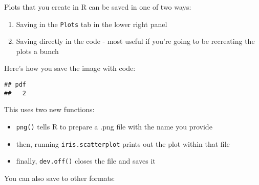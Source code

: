 \documentclass[]{article}
\newenvironment{Shaded}{\begin{snugshade}}{\end{snugshade}}
\newcommand{\KeywordTok}[1]{\textcolor[rgb]{0.13,0.29,0.53}{\textbf{#1}}}
\newcommand{\DataTypeTok}[1]{\textcolor[rgb]{0.13,0.29,0.53}{#1}}
\newcommand{\DecValTok}[1]{\textcolor[rgb]{0.00,0.00,0.81}{#1}}
\newcommand{\StringTok}[1]{\textcolor[rgb]{0.31,0.60,0.02}{#1}}
\newcommand{\CommentTok}[1]{\textcolor[rgb]{0.56,0.35,0.01}{\textit{#1}}}
\newcommand{\OperatorTok}[1]{\textcolor[rgb]{0.81,0.36,0.00}{\textbf{#1}}}
\newcommand{\NormalTok}[1]{#1}
\providecommand{\tightlist}{%
  \setlength{\itemsep}{0pt}\setlength{\parskip}{0pt}}
\begin{document}
Plots that you create in R can be saved in one of two ways:

\begin{enumerate}
\def\labelenumi{\arabic{enumi}.}
\tightlist
\item
  Saving in the \texttt{Plots} tab in the lower right panel
\item
  Saving directly in the code - most useful if you're going to be
  recreating the plots a bunch
\end{enumerate}

Here's how you save the image with code:

\begin{Shaded}
\end{Shaded}

\begin{verbatim}
## pdf 
##   2
\end{verbatim}

This uses two new functions:

\begin{itemize}
\tightlist
\item
  \texttt{png()} tells R to prepare a .png file with the name you
  provide
\item
  then, running \texttt{iris.scatterplot} prints out the plot within
  that file
\item
  finally, \texttt{dev.off()} closes the file and saves it
\end{itemize}

You can also save to other formats:

\begin{Shaded}
\end{Shaded}
\end{document}
